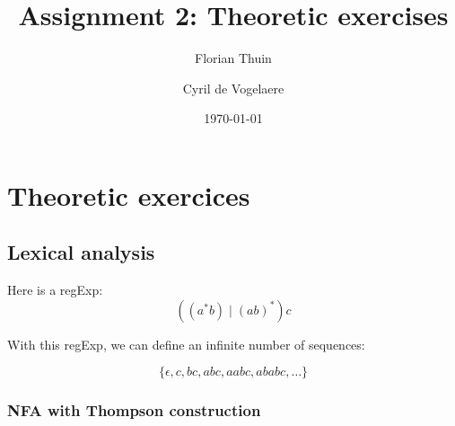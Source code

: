 \documentclass[a4paper, 11pt]{article}
\author{Florian Thuin \and Cyril de Vogelaere}
\date{\today}
\title{Assignment 2: Theoretic exercises}
\begin{document}
    \maketitle
    \tableofcontents
    \clearpage{}

	\section{Theoretic exercices}
    \subsection{Lexical analysis}
    Here is a regExp:
    $$ ((a^{*}b) \mid {(ab)}^{*})c $$

    With this regExp, we can define an infinite number of sequences:

    $$ \{ \epsilon, c, bc, abc, aabc, ababc, \ldots \} $$

    \subsubsection{NFA with Thompson construction}
\end{document}
